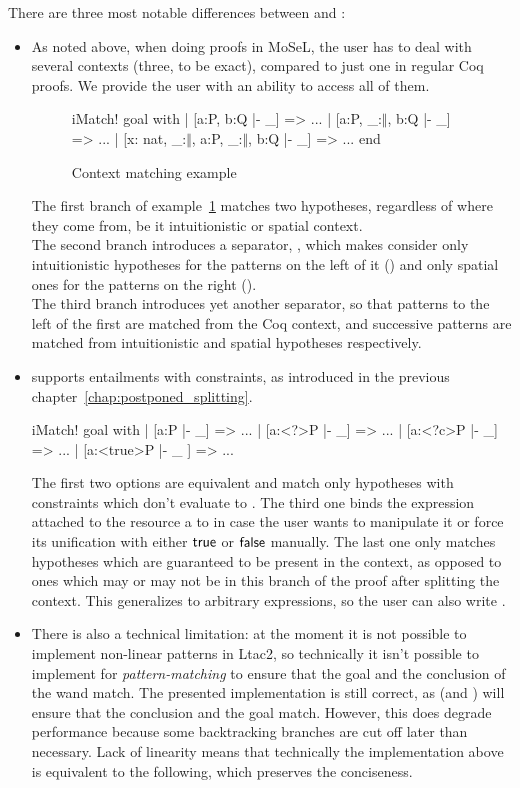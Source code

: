 There are three most notable differences between  and :
\begin{itemize}
\item As noted above, when doing proofs in MoSeL, the user has to deal with several contexts (three, to be exact), compared to just one in regular Coq proofs.
  We provide the user with an ability to access all of them.
  \begin{figure}[H]
  \begin{coq}
       iMatch! goal with
       | [a:P, b:Q |- _] => ...
       | [a:P, _:$\Vert$, b:Q |- _] => ...
       | [x: nat, _:$\Vert$, a:P, _:$\Vert$, b:Q |- _] => ...
       end
   \end{coq}
   \caption{Context matching example}
   \label{fig:example:contex_matching}
  \end{figure}
  The first branch of example~\ref{fig:example:contex_matching} matches two hypotheses, regardless of where they come from, be it intuitionistic or spatial context.\\
  The second branch introduces a separator, \coqe{_:$\Vert$}, which makes  consider only intuitionistic hypotheses for the patterns on the left of it () and only spatial ones for the patterns on the right ().\\
  The third branch introduces yet another separator, so that patterns to the left of the first \coqe{_:$\Vert$} are matched from the Coq context, and successive patterns are matched from intuitionistic and spatial hypotheses respectively.

\item {} supports entailments with constraints, as introduced in the previous chapter~\ref{chap:postponed_splitting}.
\begin{coq}
iMatch! goal with
| [a:P |- _] => ...
| [a:<?>P |- _] => ...
| [a:<?c>P |- _] => ...
| [a:<true>P |- _ ] => ...
\end{coq}
The first two options are equivalent and match only hypotheses with constraints which don't evaluate to \false.
The third one binds the expression attached to the resource a to  in case the user wants to manipulate it or force its unification with either $\textsf{true}$ or $\textsf{false}$ manually.
The last one only matches hypotheses which are guaranteed to be present in the context, as opposed to ones which may or may not be in this branch of the proof after splitting the context.
This generalizes to arbitrary expressions, so the user can also write .
\item There is also a technical limitation: at the moment it is not possible to implement non-linear patterns in Ltac2, so technically it isn't possible to implement  for \emph{pattern-matching} to ensure that the goal and the conclusion of the wand match.
  The presented implementation is still correct, as  (and ) will ensure that the conclusion and the goal match.
  However, this does degrade performance because some backtracking branches are cut off later than necessary.
  Lack of linearity means that technically the implementation above is equivalent to the following, which preserves the conciseness.


\end{itemize}
